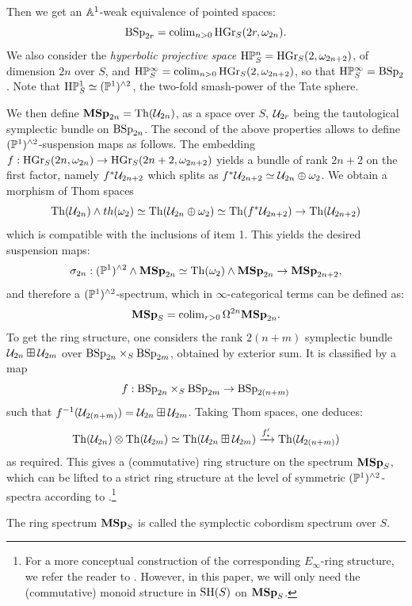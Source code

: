 \begin{num}
Then we get an $\AA^1$-weak equivalence of pointed spaces:
$$
\BSp_{2r}=\colim_{n>0} \HGr_S(2r,\omega_{2n}).
$$
We also consider the \emph{hyperbolic projective space} $\HP^n_S=\HGr_S(2,\omega_{2n+2})$,
 of dimension $2n$ over $S$, and $\HP^\infty_S=\colim_{n>0} \HGr_S(2,\omega_{2n+2})$,
 so that $\HP^\infty_S=\BSp_2$. Note that $\HP^1_S \simeq (\PP^1)^{\wedge 2}$, the two-fold smash-power
 of the Tate sphere.

We then define $\MSp_{2n}=\Th(\cU_{2n})$, as a space over $S$,
 $\cU_{2r}$ being the tautological symplectic bundle on $\BSp_{2n}$.
 The second of the above properties allows to define $(\PP^1)^{\wedge 2}$-suspension maps as follows.
 The embedding $f:\HGr_S(2n,\omega_{2n})\to \HGr_S(2n+2,\omega_{2n+2})$ yields a bundle of rank $2n+2$ on the first factor,
 namely $f^*\cU_{2n+2}$ which splits as $f^*\cU_{2n+2}\simeq \cU_{2n}\oplus \omega_2$.
 We obtain a morphism of Thom spaces
\[
\Th(\cU_{2n})\wedge th(\omega_2)\simeq \Th(\cU_{2n}\oplus \omega_2)\simeq \Th(f^*\cU_{2n+2})\to \Th(\cU_{2n+2})
\]
which is compatible with the inclusions of item 1. This yields the desired suspension maps:
\[
\sigma_{2n}:(\PP^1)^{\wedge 2} \wedge \MSp_{2n} \simeq \Th(\omega_2)\wedge \MSp_{2n}\to \MSp_{2n+2},
\]
and therefore a $(\PP^1)^{\wedge 2}$-spectrum, which in $\infty$-categorical terms can be defined as:
\begin{equation}\label{eq:MSp_as_colim}
\MSp_S=\colim_{r>0} \Omega^{2n} \MSp_{2n}.
\end{equation}
To get the ring structure, one considers the rank $2(n+m)$ symplectic bundle
 $\cU_{2n} \boxplus \cU_{2m}$ over $\BSp_{2n} \times_S \BSp_{2m}$,
 obtained by exterior sum. It is classified by a map
 $$f:\BSp_{2n} \times_S \BSp_{2m} \rightarrow \BSp_{2(n+m)}$$ such that
 $f^{-1}(\cU_{2(n+m)})=\cU_{2n} \boxplus \cU_{2m}$. Taking Thom spaces, one deduces:
$$
\Th(\cU_{2n}) \otimes \Th(\cU_{2m})
 \simeq \Th(\cU_{2n} \boxplus \cU_{2m}) \xrightarrow{f'_*} \Th(\cU_{2(n+m)})
$$
as required. This gives a (commutative) ring structure on the spectrum $\MSp_S$,
 which can be lifted to a strict ring structure at the level of symmetric $(\PP^1)^{\wedge 2}$-spectra
 according to \cite{PWcobord}.\footnote{For a more conceptual construction
 of the corresponding $E_\infty$-ring structure, we refer the reader to \cite[]{BH}.
 However, in this paper, we will only need the (commutative) monoid structure in $\SH(S)$
 on $\MSp_S$.}
\end{num}
\begin{df}
The ring spectrum $\MSp_S$ is called the symplectic cobordism spectrum over $S$.
\end{df}

